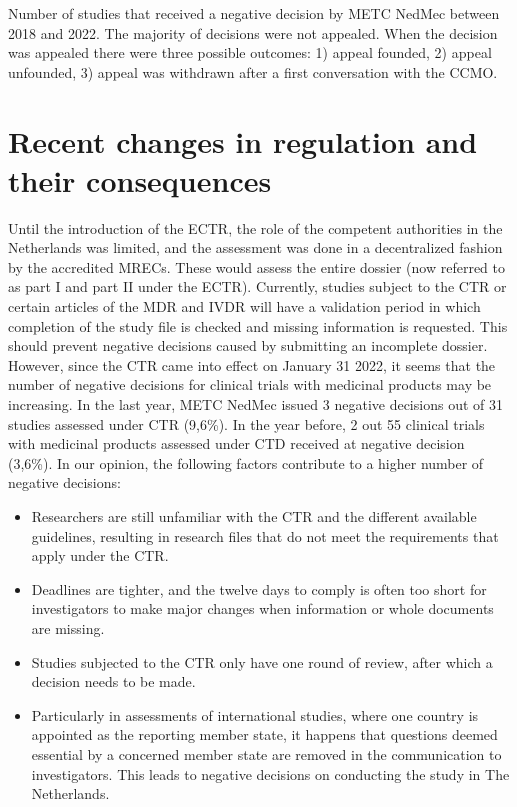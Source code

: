 \documentclass[authordate, empirical]{jote-new-article}
\begin{document}
	Number of studies that received a negative decision by METC NedMec between\textbf{ }2018 and 2022. The majority of decisions were not appealed. When the decision was appealed there were three possible outcomes: 1) appeal founded, 2) appeal unfounded, 3) appeal was withdrawn after a first conversation with the CCMO.







	\section{Recent changes in regulation and their consequences}



	Until the introduction of the ECTR, the role of the competent authorities in the Netherlands was limited, and the assessment was done in a decentralized fashion by the accredited MRECs. These would assess the entire dossier (now referred to as part I and part II under the ECTR). Currently, studies subject to the CTR or certain articles of the MDR and IVDR will have a validation period in which completion of the study file is checked and missing information is requested. This should prevent negative decisions caused by submitting an incomplete dossier. However, since the CTR came into effect on January 31 2022, it seems that the number of negative decisions for clinical trials with medicinal products may be increasing. In the last year, METC NedMec issued 3 negative decisions out of 31 studies assessed under CTR (9,6\%). In the year before, 2 out 55 clinical trials with medicinal products assessed under CTD received at negative decision (3,6\%). In our opinion, the following factors contribute to a higher number of negative decisions:

	\begin{itemize}


		\item Researchers are still unfamiliar with the CTR and the different available guidelines, resulting in research files that do not meet the requirements that apply under the CTR.



		\item
		Deadlines are tighter, and the twelve days to comply is often too short for investigators to make major changes when information or whole documents are missing.



		\item Studies subjected to the CTR only have one round of review, after which a decision needs to be made.



		\item
		Particularly in assessments of international studies, where one country is appointed as the reporting member state, it happens that questions deemed essential by a concerned member state are removed in the communication to investigators. This leads to negative decisions on conducting the study in The Netherlands.


	\end{itemize}
\end{document}
